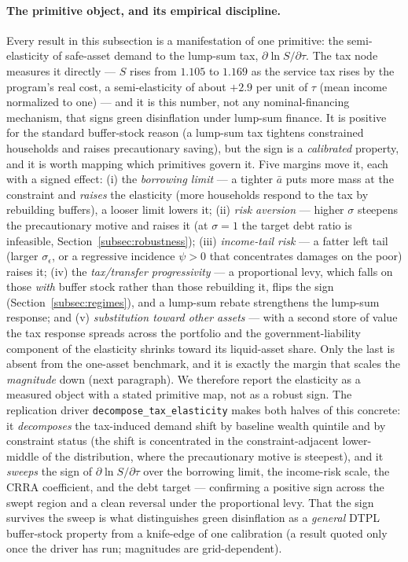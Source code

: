 \documentclass[12pt]{article}
\newcommand{\Sfun}{S}
\begin{document}
\paragraph{The primitive object, and its empirical discipline.} Every result
in this subsection is a manifestation of one primitive: the semi-elasticity of
safe-asset demand to the lump-sum tax, $\partial\ln\Sfun/\partial\tau$. The
tax node measures it directly --- $\Sfun$ rises from $1.105$ to $1.169$ as the
service tax rises by the program's real cost, a semi-elasticity of about
$+2.9$ per unit of $\tau$ (mean income normalized to one) --- and it is this
number, not any nominal-financing mechanism, that signs green disinflation
under lump-sum finance. It is positive for the standard buffer-stock reason
(a lump-sum tax tightens constrained households and raises precautionary
saving), but the sign is a \emph{calibrated} property, and it is worth mapping
which primitives govern it. Five margins move it, each with a signed effect:
(i) the \emph{borrowing limit} --- a tighter $\bar a$ puts more mass at the
constraint and \emph{raises} the elasticity (more households respond to the tax
by rebuilding buffers), a looser limit lowers it; (ii) \emph{risk aversion} ---
higher $\sigma$ steepens the precautionary motive and raises it (at $\sigma=1$
the target debt ratio is infeasible, Section~\ref{subsec:robustness}); (iii)
\emph{income-tail risk} --- a fatter left tail (larger $\sigma_\epsilon$, or a
regressive incidence $\psi>0$ that concentrates damages on the poor) raises it;
(iv) the \emph{tax/transfer progressivity} --- a proportional levy, which falls
on those \emph{with} buffer stock rather than those rebuilding it, flips the
sign (Section~\ref{subsec:regimes}), and a lump-sum rebate strengthens the
lump-sum response; and (v) \emph{substitution toward other assets} --- with a
second store of value the tax response spreads across the portfolio and the
government-liability component of the elasticity shrinks toward its
liquid-asset share. Only the last is absent from the one-asset benchmark, and
it is exactly the margin that scales the \emph{magnitude} down (next paragraph).
We therefore report the elasticity as a measured object with a stated primitive
map, not as a robust sign. The replication driver
\texttt{decompose\_tax\_elasticity} makes both halves of this concrete: it
\emph{decomposes} the tax-induced demand shift by baseline wealth quintile and
by constraint status (the shift is concentrated in the constraint-adjacent
lower-middle of the distribution, where the precautionary motive is steepest),
and it \emph{sweeps} the sign of $\partial\ln\Sfun/\partial\tau$ over the
borrowing limit, the income-risk scale, the CRRA coefficient, and the debt
target --- confirming a positive sign across the swept region and a clean
reversal under the proportional levy. That the sign survives the sweep is what
distinguishes green disinflation as a \emph{general} DTPL buffer-stock property
from a knife-edge of one calibration (a result quoted only once the driver has
run; magnitudes are grid-dependent).
\end{document}
